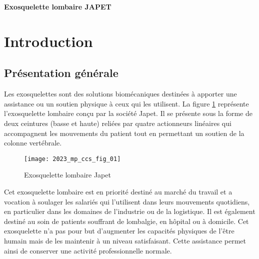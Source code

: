 
\begin{center}
\Large\textbf{\textsf{Exosquelette lombaire JAPET}}
\normalsize
\end{center}

%
%
%
%
%




\section{Introduction}
\subsection{Présentation générale} %
\ifprof
\else
Les exosquelettes sont des solutions biomécaniques destinées à apporter une assistance ou un soutien physique à ceux qui les utilisent. La figure \ref{ccs_mp_2023_fig_01} représente l'exosquelette lombaire conçu par la société Japet. Il se présente sous la forme de deux ceintures (basse et haute) reliées par quatre actionneurs linéaires qui accompagnent les mouvements du patient tout en permettant un soutien de la colonne vertébrale.
\



\begin{figure}[!h]
\centering
\texttt{[image: 2023\_mp\_ccs\_fig\_01]}
\caption{\label{ccs_mp_2023_fig_01}  Exosquelette lombaire Japet}
\end{figure}


Cet exosquelette lombaire est en priorité destiné au marché du travail et a vocation à soulager les salariés qui l'utilisent dans leurs mouvements quotidiens, en particulier dans les domaines de l'industrie ou de la logistique. Il est également destiné au soin de patients souffrant de lombalgie, en hôpital ou à domicile. Cet exosquelette n'a pas pour but d'augmenter les capacités physiques de l'être humain mais de les maintenir à un niveau satisfaisant. Cette assistance permet ainsi de conserver une activité professionnelle normale.

